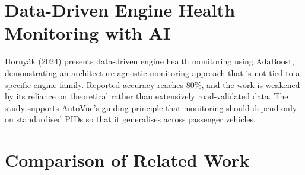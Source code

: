 \documentclass[10pt,a4paper]{report}
\begin{document}
\section{Data-Driven Engine Health Monitoring with AI}

Hornyák (2024) \cite{article11} presents data-driven engine health monitoring using AdaBoost, demonstrating an architecture-agnostic monitoring approach that is not tied to a specific engine family. Reported accuracy reaches 80\%, and the work is weakened by its reliance on theoretical rather than extensively road-validated data. The study supports AutoVue's guiding principle that monitoring should depend only on standardised PIDs so that it generalises across passenger vehicles.

\section{Comparison of Related Work}
\end{document}
